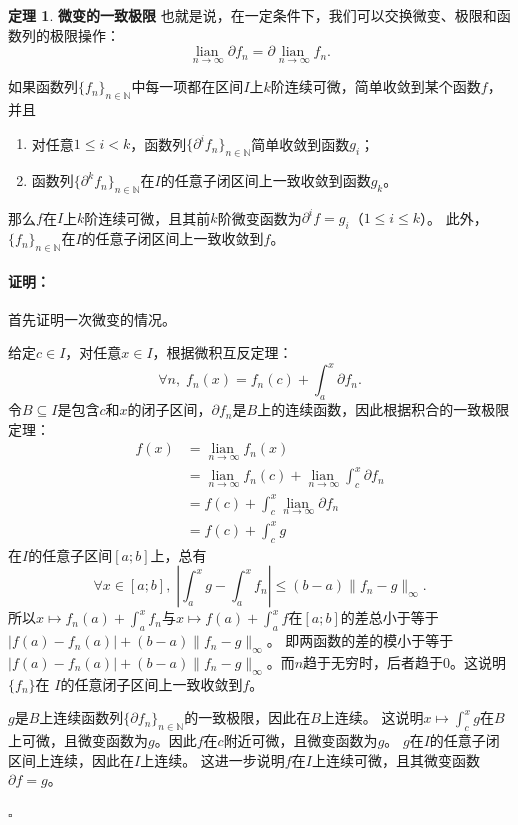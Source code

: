 \documentclass[12pt,UTF8]{ctexbook}
\newcommand{\lian}[1]{
    \underset{#1}{\operatorname{lian}\,}
}
\theoremstyle{definition}
\newtheorem{tm}{定理}[section]
\theoremstyle{plain}
\renewenvironment{proof}{\paragraph{\textbf{证明：}}}{\hfill$\square$}
\begin{document}
\begin{appendix}
\begin{tm}{\textbf{微变的一致极限}}
    也就是说，在一定条件下，我们可以交换微变、极限和函数列的极限操作：
    $$ \lian{n\to \infty} \partial f_n = \partial \lian{n\to \infty} f_n. $$

    如果函数列$\{f_n\}_{n\in\mathbb{N}}$中每一项都在区间$I$上$k$阶连续可微，简单收敛到某个函数$f$，并且
    \begin{enumerate}
        \item 对任意$1 \leqslant i < k$，函数列$\{\partial^i f_n\}_{n\in\mathbb{N}}$简单收敛到函数$g_i$；
        \item 函数列$\{\partial^k f_n\}_{n\in\mathbb{N}}$在$I$的任意子闭区间上一致收敛到函数$g_k$。
    \end{enumerate}
    那么$f$在$I$上$k$阶连续可微，且其前$k$阶微变函数为$\partial^i f = g_i$（$1 \leqslant i\leqslant k$）。
    此外，$\{f_n\}_{n\in\mathbb{N}}$在$I$的任意子闭区间上一致收敛到$f$。

\end{tm}

\begin{proof}
    首先证明一次微变的情况。
    
    给定$c\in I$，对任意$x\in I$，根据微积互反定理：
    $$ \forall n,\; f_n(x) = f_n(c) + \int_a^x \partial f_n. $$
    令$B\subseteq I$是包含$c$和$x$的闭子区间，$\partial f_n$是$B$上的连续函数，因此根据积合的一致极限定理：
    \begin{align*}
        f(x) &= \lian{n\to\infty} f_n(x) \\
        &= \lian{n\to\infty} f_n(c) + \lian{n\to\infty} \int_c^x \partial f_n \\
        &= f(c) + \int_c^x \lian{n\to\infty} \partial f_n \\
        &= f(c) + \int_c^x g
    \end{align*}
    在$I$的任意子区间$[a;b]$上，总有
    $$ \forall x \in [a;b], \; \left|\int_a^x g - \int_a^x f_n \right| \leqslant (b - a) \|f_n - g\|_{\infty}.$$
    所以$x\mapsto f_n(a) + \int_a^x f_n$与$x\mapsto f(a) + \int_a^x f$在$[a;b]$的差总小于等于$|f(a) - f_n(a)| + (b - a) \|f_n - g\|_{\infty}$。
    即两函数的差的模小于等于$|f(a) - f_n(a)| + (b - a) \|f_n - g\|_{\infty}$。而$n$趋于无穷时，后者趋于$0$。这说明$\{f_n\}$在
    $I$的任意闭子区间上一致收敛到$f$。

    $g$是$B$上连续函数列$\{\partial f_n\}_{n\in\mathbb{N}}$的一致极限，因此在$B$上连续。
    这说明$x\mapsto \int_c^x g $在$B$上可微，且微变函数为$g$。因此$f$在$c$附近可微，且微变函数为$g$。
    $g$在$I$的任意子闭区间上连续，因此在$I$上连续。
    这进一步说明$f$在$I$上连续可微，且其微变函数$\partial f = g$。
    

\end{proof}
\end{appendix}
\end{document}
